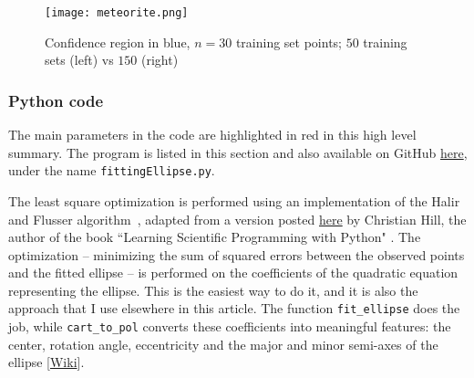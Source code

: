 \documentclass[oneside,10pt]{book}
\begin{document}
\begin{figure}[H]
\centering
\texttt{[image: meteorite.png]}
\caption{Confidence region in blue, $n=30$ training set points; $50$ training sets (left) vs $150$ (right)}
\label{fig:meteor}
\end{figure}




\subsubsection{Python code}\label{pipybv}

The main parameters in the code are highlighted in red in this high level summary. The program
  is listed in this section and also available on GitHub
\href{https://github.com/VincentGranville/Machine-Learning/blob/main/Source\%20Code/fittingEllipse.py}{here},
 under the name \texttt{fittingEllipse.py}.

The least square optimization is performed using an implementation of  the Halir and Flusser algorithm~\cite{Halir98numericallystable}, adapted from a version posted
 \href{https://scipython.com/blog/direct-linear-least-squares-fitting-of-an-ellipse/}{here} by Christian Hill, the author of the book
``Learning Scientific Programming with Python" \cite{chsp2016}. The optimization -- minimizing the sum of squared errors between the observed points and the fitted ellipse -- is performed on the coefficients of the quadratic equation representing the ellipse.
 This is the easiest way to do it, and it is also the approach that I use elsewhere in this article.
 The function \texttt{fit\_ellipse} does the job, while \texttt{cart\_to\_pol} converts these coefficients into meaningful features: the center, rotation angle, eccentricity and the major and minor semi-axes of the ellipse [\href{https://simple.wikipedia.org/wiki/Semi-major_and_semi-minor_axes}{Wiki}]. \vspace{1ex}


\vspace{1ex}
\end{document}
